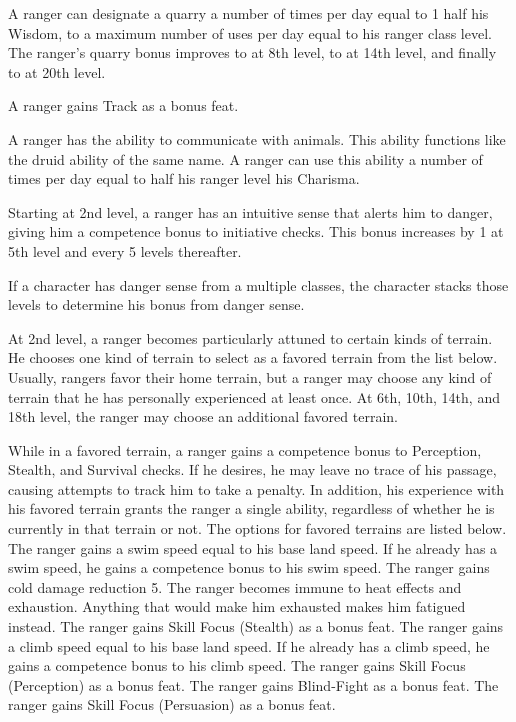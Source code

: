 \par A ranger can designate a quarry a number of times per day equal to 1 \add half his Wisdom, to a maximum number of uses per day equal to his ranger class level. The ranger's quarry bonus improves to  at 8th level, to  at 14th level, and finally to  at 20th level.

 A ranger gains Track as a bonus feat.

 A ranger has the ability to communicate with animals. This ability functions like the druid ability of the same name. A ranger can use this ability a number of times per day equal to half his ranger level \add his Charisma.

 Starting at 2nd level, a ranger has an intuitive sense that alerts him to danger, giving him a  competence bonus to initiative checks. This bonus increases by 1 at 5th level and every 5 levels thereafter.
\par If a character has danger sense from a multiple classes, the character stacks those levels to determine his bonus from danger sense.

 At 2nd level, a ranger becomes particularly attuned to certain kinds of terrain. He chooses one kind of terrain to select as a favored terrain from the list below. Usually, rangers favor their home terrain, but a ranger may choose any kind of terrain that he has personally experienced at least once. At 6th, 10th, 14th, and 18th level, the ranger may choose an additional favored terrain.
\par While in a favored terrain, a ranger gains a  competence bonus to Perception, Stealth, and Survival checks. If he desires, he may leave no trace of his passage, causing attempts to track him to take a  penalty. In addition, his experience with his favored terrain grants the ranger a single ability, regardless of whether he is currently in that terrain or not. The options for favored terrains are listed below.
 The ranger gains a swim speed equal to his base land speed. If he already has a swim speed, he gains a  competence bonus to his swim speed.
 The ranger gains cold damage reduction 5.
 The ranger becomes immune to heat effects and exhaustion. Anything that would make him exhausted makes him fatigued instead.
 The ranger gains Skill Focus (Stealth) as a bonus feat.
 The ranger gains a climb speed equal to his base land speed. If he already has a climb speed, he gains a  competence bonus to his climb speed.
 The ranger gains Skill Focus (Perception) as a bonus feat.
 The ranger gains Blind-Fight as a bonus feat.
 The ranger gains Skill Focus (Persuasion) as a bonus feat.


